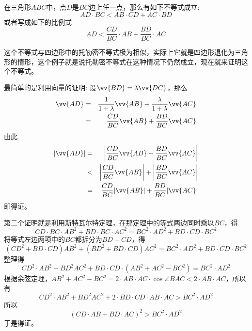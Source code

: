 \begin{example}[三角形中的托勒密不等式]
  \label{example:ptolemy-inequality-for-triangle}
  在三角形$ABC$中，点$D$是$BC$边上任一点，那么有如下不等式成立:
  \begin{equation}
    \label{eq:ptolemy-inequality-for-triangle}
    AD \cdot BC < AB \cdot CD + AC \cdot BD
  \end{equation}
  或者写成如下的比例式
  \begin{equation}
    \label{eq:ptolemy-inequality-for-triangle-rate}
    AD < \frac{CD}{BC} \cdot AB + \frac{BD}{BC} \cdot AC
  \end{equation}

  这个不等式与四边形中的托勒密不等式极为相似，实际上它就是四边形退化为三角形的情形，这个例子就是说托勒密不等式在这种情况下仍然成立，现在就来证明这个不等式。

  最简单的是利用向量的证明: 设$\vv{BD}=\lambda\vv{DC}$，那么
  \begin{eqnarray*}
    \vv{AD} & = & \frac{1}{1+\lambda}\vv{AB}+\frac{\lambda}{1+\lambda}\vv{AC} \\
   & = & \frac{CD}{BC}\vv{AB}+\frac{BD}{BC}\vv{AC} 
  \end{eqnarray*}
  由此
  \begin{eqnarray*}
    |\vv{AD}| & = & \left| \frac{CD}{BC}\vv{AB}+\frac{BD}{BC}\vv{AC} \right| \\
              & < & \left| \frac{CD}{BC}\vv{AB} \right| + \left| \frac{BD}{BC}\vv{AC} \right| \\
              & = & \frac{CD}{BC} | \vv{AB} | + \frac{BD}{BC} |\vv{AC} |
  \end{eqnarray*}
  即得证。

  第二个证明就是利用斯特瓦尔特定理，在那定理中的等式两边同时乘以$BC$，得
  \begin{equation*}
    CD \cdot BC \cdot AB^2 + BD \cdot BC \cdot AC^2 = BC^2 \cdot AD^2 + BD \cdot CD \cdot BC^2
  \end{equation*}
  将等式左边两项中的$BC$都拆分为$BD+CD$，得
  \begin{equation*}
    (CD^2+ BD\cdot CD) AB^2 + (BD^2+BD\cdot CD) AC^2 = BC^2 \cdot AD^2 + BD \cdot CD \cdot BC^2
  \end{equation*}
  整理得
  \begin{equation*}
    CD^2 \cdot AB^2 + BD^2 AC^2 + BD \cdot CD \cdot (AB^2+AC^2-BC^2) = BC^2 \cdot AD^2
  \end{equation*}
  根据余弦定理，$AB^2+AC^2-BC^2=2 \cdot AB \cdot AC \cdot \cos{\angle BAC} < 2 \cdot AB \cdot AC$，所以有
  \begin{equation*}
    CD^2 \cdot AB^2 + BD^2 AC^2 + 2 \cdot BD \cdot CD \cdot AB \cdot AC > BC^2 \cdot AD^2
  \end{equation*}
  所以
  \begin{equation*}
    (CD \cdot AB + BD \cdot AC)^2 > BC^2 \cdot AD^2
  \end{equation*}
  于是得证。
\end{example}

